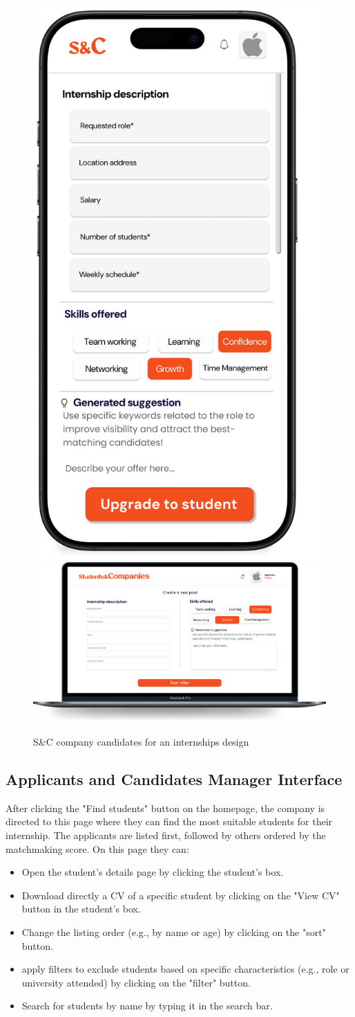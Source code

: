 \begin{figure}[H]
    \centering
    \includegraphics[width=0.2\linewidth]{Images/Mock-up/mobile post an internship.png}
    \includegraphics[width=0.75\linewidth]{Images/Mock-up/Post an internship.png}
    \caption{S\&C company candidates for an internships design}
    \label{fig:homepage-design}
\end{figure}

\subsection{Applicants and Candidates Manager Interface}

After clicking the "Find students" button on the homepage, the company is directed to this page where they can find the most suitable students for their internship. The applicants are listed first, followed by others ordered by the matchmaking score. On this page they can:

\begin{itemize} 
    \item Open the student's details page by clicking the student's box. 
    \item Download directly a CV of a specific student by clicking on the "View CV" button in the student's box. 
    \item Change the listing order (e.g., by name or age) by clicking on the "sort" button. 
    \item apply filters to exclude students based on specific characteristics (e.g., role or university attended) by clicking on the "filter" button. 
    \item Search for students by name by typing it in the search bar. 
\end{itemize} \\

